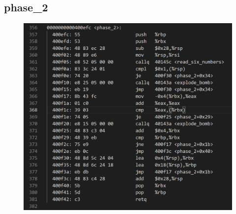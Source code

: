 \documentclass[12pt, a4paper, oneside]{ctexart}
\begin{document}
\subsection{phase\_2}
\begin{figure}[htbp]
\includegraphics[scale=0.4]{image/2.3-1.png}
\end{figure}
\end{document}
